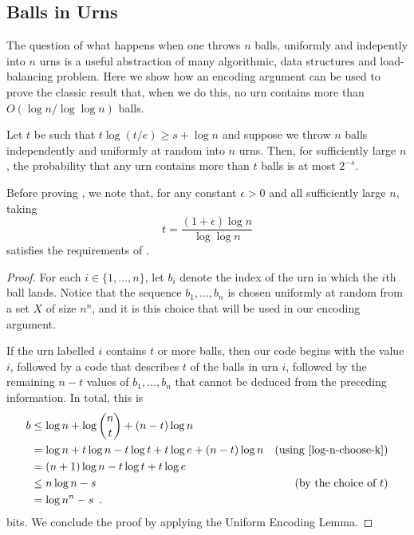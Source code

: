 \documentclass{patmorin}
\begin{document}
\subsection{Balls in Urns}

The question of what happens when one throws $n$ balls, uniformly and
indepently into $n$ urns is a useful abstraction of many algorithmic,
data structures and load-balancing problem.  Here we show how an encoding
argument can be used to prove the classic result that, when we do this,
no urn contains more than $O(\log n/\log\log n)$ balls.

\begin{thm}
  Let $t$ be such that $t\log(t/e) \ge s+\log n$ and suppose we throw
  $n$ balls independently and uniformly at random into $n$ urns. Then,
  for sufficiently large $n$, the probability that any urn contains more 
  than $t$ balls is at most $2^{-s}$.
\end{thm}

Before proving , we note that, for any constant $\epsilon
>0$ and all sufficiently large $n$, taking
\[
   t = \frac{(1+\epsilon)\log n}{\log\log n}
\] 
satisfies the requirements of .

\begin{proof}
  For each $i\in\{1,\ldots,n\}$, let $b_i$ denote the index of the urn in
  which the $i$th ball lands. Notice that the sequence $b_1,\ldots,b_n$
  is chosen uniformly at random from a set $X$ of size $n^n$, and it is this
  choice that will be used in our encoding argument.

  If the urn labelled $i$ contains $t$ or more balls, then our code
  begins with the value $i$, followed by a code that describes $t$ of
  the balls in urn $i$, followed by the remaining $n-t$ values of
  $b_1,\ldots,b_n$ that cannot be deduced from the preceding
  information.  In total, this is
  \begin{align*}
    b &\le \log n + \log\binom{n}{t} 
           + (n-t)\log n \\
     & = \log n + t\log n - t\log t + t\log e  + (n-t)\log n 
             & \text{(using \eqref{log-n-choose-k})} \\
     & = (n+1)\log n - t\log t + t\log e \\
     & \le  n\log n - s &\text{(by the choice of $t$)} \\
     & =  \log n^n - s \enspace . 
  \end{align*}
  bits. We conclude the proof by applying the Uniform Encoding Lemma.
\end{proof}
\end{document}
